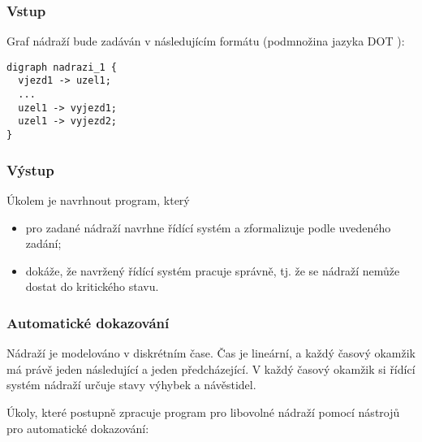 \documentclass[a4paper,journal]{IEEEtran}
\begin{document}
\subsubsection{Vstup}
Graf nádraží bude zadáván v následujícím formátu 
(podmnožina jazyka DOT \cite{Graphviz}):

\begin{verbatim}
digraph nadrazi_1 { 
  vjezd1 -> uzel1; 
  ...
  uzel1 -> vyjezd1; 
  uzel1 -> vyjezd2; 
} 
\end{verbatim}

\subsubsection{Výstup}
Úkolem je navrhnout program, který
\begin{itemize}
	\item pro zadané nádraží navrhne řídící systém a zformalizuje podle uvedeného zadání;
	\item dokáže, že navržený řídící systém pracuje správně, tj. že se nádraží nemůže dostat 
	do kritického stavu.
\end{itemize}

\subsubsection{Automatické dokazování}
Nádraží je modelováno v diskrétním čase. Čas je lineární, a každý časový okamžik má právě jeden následující a jeden předcházející. V každý časový okamžik si řídící systém nádraží určuje stavy výhybek a návěstidel.

Úkoly, které postupně zpracuje program pro libovolné nádraží pomocí nástrojů pro automatické dokazování:
\end{document}
